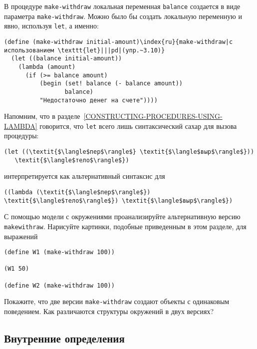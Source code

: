 \begin{exercise}{3.10}\label{EX3.10}%
В процедуре {\tt make-withdraw} локальная
переменная {\tt balance} создается в виде параметра
{\tt make-withdraw}.  Можно было бы создать локальную
переменную и явно, используя {\tt let}, а именно:

\begin{Verbatim}[fontsize=\small]
(define (make-withdraw initial-amount)\index{ru}{make-withdraw|с использованием \texttt{let}|||pd|(упр.~3.10)}
  (let ((balance initial-amount))
    (lambda (amount)
      (if (>= balance amount)
          (begin (set! balance (- balance amount))
                 balance)
          "Недостаточно денег на счете"))))
\end{Verbatim}
Напомним, что в
разделе~\ref{CONSTRUCTING-PROCEDURES-USING-LAMBDA} говорится, что
{\tt let} всего лишь синтаксический сахар для вызова процедуры:

\begin{Verbatim}[fontsize=\small]
(let ((\textit{$\langle$пер$\rangle$} \textit{$\langle$выр$\rangle$}))
   \textit{$\langle$тело$\rangle$})
\end{Verbatim}
интерпретируется как альтернативный синтаксис для

\begin{Verbatim}[fontsize=\small]
((lambda (\textit{$\langle$пер$\rangle$}) \textit{$\langle$тело$\rangle$}) \textit{$\langle$выр$\rangle$})
\end{Verbatim}
С помощью модели с окружениями проанализируйте альтернативную версию
{\tt make\-withraw}.  Нарисуйте картинки, подобные приведенным
в этом разделе, для выражений

\begin{Verbatim}[fontsize=\small]
(define W1 (make-withdraw 100))

(W1 50)

(define W2 (make-withdraw 100))
\end{Verbatim}
Покажите, что две версии {\tt make-withdraw} создают объекты с
одинаковым поведением.  Как различаются структуры окружений в двух
версиях?
\end{exercise}

\subsection{Внутренние определения}
\label{INTERNAL-DEFINITIONS-CH3}



